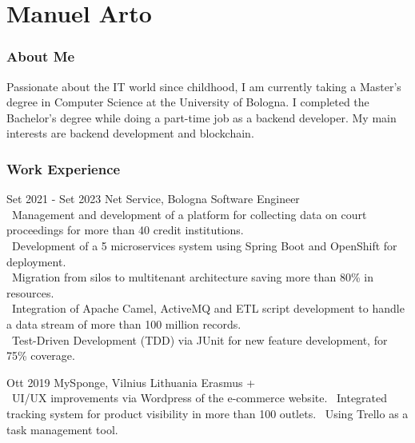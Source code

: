 \documentclass{tccv}
\begin{document}
\part{Manuel Arto}

\section{About Me}

Passionate about the IT world since childhood, I am currently taking a Master's degree in Computer Science at the University of Bologna. I completed the Bachelor's degree while doing a part-time job as a backend developer. My main interests are backend development and blockchain.


\section{Work Experience}

\begin{eventlist}

     \item{Set 2021 - Set 2023}
     {Net Service, Bologna}
     {Software Engineer} \\
     \textbullet~Management and development of a platform for collecting data on court proceedings for more than 40 credit institutions. \\
     \textbullet~Development of a 5 microservices system using Spring Boot and OpenShift for deployment. \\
     \textbullet~Migration from silos to multitenant architecture saving more than 80\% in resources. \\
     \textbullet~Integration of Apache Camel, ActiveMQ and ETL script development to handle a data stream of more than 100 million records. \\
     \textbullet~Test-Driven Development (TDD) via JUnit for new feature development, for 75\% coverage.

\item{Ott 2019}
     {MySponge, Vilnius Lithuania}
     {Erasmus +} \\
     \textbullet~UI/UX improvements via Wordpress of the e-commerce website. \newline
     \textbullet~Integrated tracking system for product visibility in more than 100 outlets. \newline
     \textbullet~Using Trello as a task management tool.

\end{eventlist}
\end{document}
